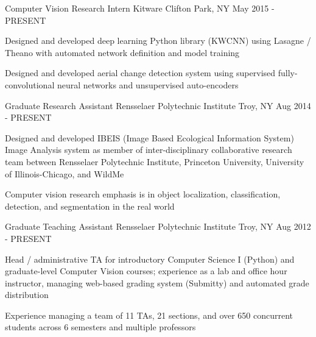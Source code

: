 

\begin{cventries}

  \cventry
    {Computer Vision Research Intern} %
    {Kitware} %
    {Clifton Park, NY} %
    {May 2015 - PRESENT} %
    {
      \begin{cvitems} %
        \item {Designed and developed deep learning Python library (KWCNN) using Lasagne / Theano with automated network definition and model training}
        \item {Designed and developed aerial change detection system using supervised fully-convolutional neural networks and unsupervised auto-encoders}
      \end{cvitems}
    }

\ifresume
\else
    \cventry
      {Graduate Research Assistant} %
      {Rensselaer Polytechnic Institute} %
      {Troy, NY} %
      {Aug 2014 - PRESENT} %
      {
        \begin{cvitems} %
          \item {Designed and developed IBEIS (Image Based Ecological Information System) Image Analysis system as member of inter-disciplinary collaborative research team between Rensselaer Polytechnic Institute, Princeton University, University of Illinois-Chicago, and WildMe}
          \item {Computer vision research emphasis is in object localization, classification, detection, and segmentation in the real world}
        \end{cvitems}
      }
\fi

  \cventry
    {Graduate Teaching Assistant} %
    {Rensselaer Polytechnic Institute} %
    {Troy, NY} %
    {Aug 2012 - PRESENT} %
    {
      \begin{cvitems} %
        \item {Head / administrative TA for introductory Computer Science I (Python) and graduate-level Computer Vision courses; experience as a lab and office hour instructor, managing web-based grading system (Submitty) and automated grade distribution}
        \item {Experience managing a team of 11 TAs, 21 sections, and over 650 concurrent students across 6 semesters and multiple professors}
      \end{cvitems}
    }


\end{cventries}
